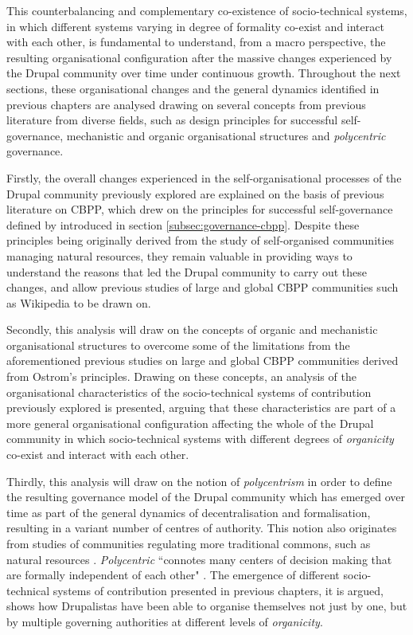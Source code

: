 This counterbalancing and complementary co-existence of socio-technical systems, in which different systems varying in degree of formality co-exist and interact with each other, is fundamental to understand, from a macro perspective, the resulting organisational configuration after the massive changes experienced by the Drupal community over time under continuous growth. Throughout the next sections, these organisational changes and the general dynamics identified in previous chapters are analysed drawing on several concepts from previous literature from diverse fields, such as design principles for successful self-governance, mechanistic and organic organisational structures and \textit{polycentric} governance.

Firstly, the overall changes experienced in the self-organisational processes of the Drupal community previously explored are explained on the basis of previous literature on CBPP, which drew on the principles for successful self-governance defined by \textcite[88-102]{ostrom1990governing} introduced in section \ref{subsec:governance-cbpp}. Despite these principles being originally derived from the study of self-organised communities managing natural resources, they remain valuable in providing ways to understand the reasons that led the Drupal community to carry out these changes, and allow previous studies of large and global CBPP communities such as Wikipedia to be drawn on.

Secondly, this analysis will draw on the concepts of organic and mechanistic organisational structures \parencite{burns1961management} to overcome some of the limitations from the aforementioned previous studies on large and global CBPP communities derived from Ostrom's principles. Drawing on these concepts, an analysis of the organisational characteristics of the socio-technical systems of contribution previously explored is presented, arguing that these characteristics are part of a more general organisational configuration affecting the whole of the Drupal community in which socio-technical systems with different degrees of \textit{organicity} co-exist and interact with each other.

Thirdly, this analysis will draw on the notion of \textit{polycentrism} in order to define the resulting governance model of the Drupal community which has emerged over time as part of the general dynamics of decentralisation and formalisation, resulting in a variant number of centres of authority. This notion also originates from studies of communities regulating more traditional commons, such as natural resources \parencite{ostrom1961organization}. \textit{Polycentric} ``connotes many centers of decision making that are formally independent of each other" \parencite[831]{ostrom1961organization}. The emergence of different socio-technical systems of contribution presented in previous chapters, it is argued, shows how Drupalistas have been able to organise themselves not just by one, but by multiple governing authorities at different levels of \textit{organicity}.

